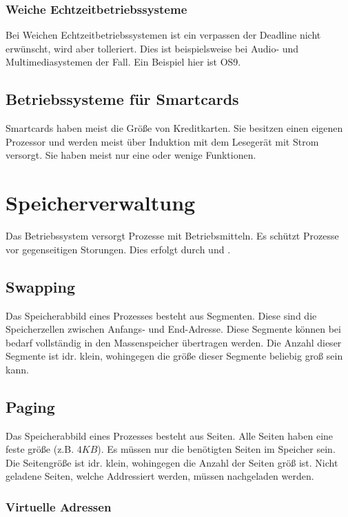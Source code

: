 \subsubsection*{Weiche Echtzeitbetriebssysteme}

Bei Weichen Echtzeitbetriebssystemen ist ein verpassen der Deadline nicht erwünscht, wird aber tolleriert. Dies ist beispielsweise bei Audio- und Multimediasystemen der Fall. Ein Beispiel hier ist OS9.

\subsection{Betriebssysteme für Smartcards}

Smartcards haben meist die Größe von Kreditkarten. Sie besitzen einen eigenen Prozessor und werden meist über Induktion mit dem Lesegerät mit Strom versorgt. Sie haben meist nur eine oder wenige Funktionen.

\section{Speicherverwaltung}

Das Betriebssystem versorgt Prozesse mit Betriebsmitteln. Es schützt Prozesse vor gegenseitigen Storungen. Dies erfolgt durch  und .

\subsection{Swapping}

Das Speicherabbild eines Prozesses besteht aus Segmenten. Diese sind die Speicherzellen zwischen Anfangs- und End-Adresse. Diese Segmente können bei bedarf vollständig in den Massenspeicher übertragen werden. Die Anzahl dieser Segmente ist idr. klein, wohingegen die größe dieser Segmente beliebig groß sein kann.

\subsection{Paging}

Das Speicherabbild eines Prozesses besteht aus Seiten. Alle Seiten haben eine feste größe (z.B. $4KB$). Es müssen nur die benötigten Seiten im Speicher sein. Die Seitengröße ist idr. klein, wohingegen die Anzahl der Seiten größ ist. Nicht geladene Seiten, welche Addressiert werden, müssen nachgeladen werden.

\subsubsection{Virtuelle Adressen}

